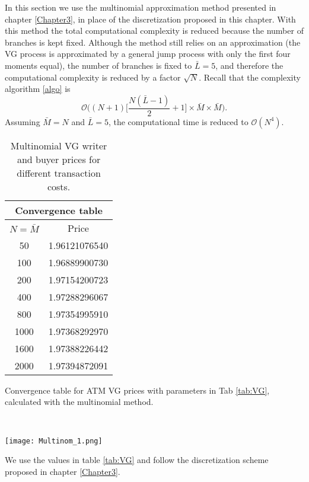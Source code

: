 In this section we use the multinomial approximation method presented in chapter \ref{Chapter3}, in place of the discretization proposed in this chapter.
With this method the total computational complexity is reduced because the number of branches is kept fixed.
Although the method still relies on an approximation (the VG process is approximated by a general jump process with only the first four moments equal),
the number of branches is fixed to $\bar L = 5$, and therefore the computational complexity is reduced by a factor $\sqrt{N}$.
Recall that the complexity algorithm \ref{algo} is 
$$\mathcal{O}\biggl( (N+1)\bigl[\frac{N(\bar L-1)}{2}+1 \bigr] \times \bar M \times \bar M \biggr).$$
Assuming $\bar M = N$ and $\bar L = 5$, the computational time is reduced to $\mathcal{O}(N^4)$. 
\begin{table}[t!]
\begin{minipage}{0.5\linewidth}
\centering
 \begin{tabular}{||c|c||}
 \hline
  \multicolumn{2}{|c|}{Convergence table} \\
  \hline
  $N = \bar M$ & Price \\
  \hline
    50 & 1.96121076540 \\
  \hline
    100 & 1.96889900730 \\
  \hline  
    200 &  1.97154200723 \\
  \hline
    400 & 1.97288296067 \\
  \hline   
    800 & 1.97354995910  \\
  \hline
    1000 & 1.97368292970 \\ 
  \hline
    1600 & 1.97388226442  \\
  \hline
    2000 & 1.97394872091  \\  \hline
  \end{tabular}
  \caption{Convergence table for ATM VG prices with parameters in Tab \ref{tab:VG}, calculated with the multinomial method.}
  \label{tab:convergence31}
\end{minipage}
 \
 \begin{minipage}{0.5\linewidth}
   \texttt{[image: Multinom\_1.png]}
   \caption{Multinomial VG writer and buyer prices for different transaction costs.}
   \label{Fig37}
 \end{minipage}
\end{table}
We use the values in table \ref{tab:VG} and follow the discretization scheme proposed in chapter \ref{Chapter3}. 
